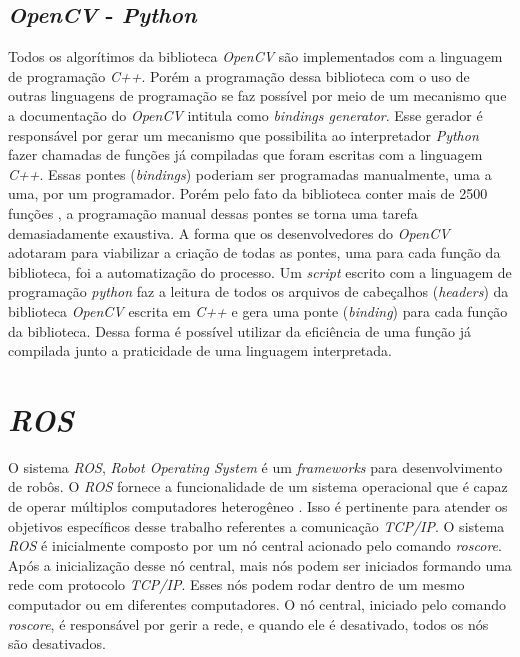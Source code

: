 \pagebreak

\subsection{\textit{OpenCV} - \textit{Python}}
Todos os algorítimos da biblioteca \textit{OpenCV} são implementados com a linguagem de programação \textit{C++}. 
Porém a programação dessa biblioteca com o uso de outras linguagens de programação se faz possível por meio de um mecanismo que a documentação do \textit{OpenCV} intitula como \textit{bindings generator}. 
Esse gerador é responsável por gerar um mecanismo que possibilita ao interpretador \textit{Python} fazer chamadas de funções já compiladas que foram escritas com a linguagem \textit{C++}.
Essas pontes (\textit{bindings}) poderiam ser programadas manualmente, uma a uma, por um programador. 
Porém pelo fato da biblioteca conter mais de 2500 funções \cite{aboutopencv2019}, a programação manual dessas pontes se torna uma tarefa demasiadamente exaustiva.
A forma que os desenvolvedores do \textit{OpenCV} adotaram para viabilizar a criação de todas as pontes, uma para cada função da biblioteca, foi a automatização do processo. 
Um \textit{script} escrito com a linguagem de programação \textit{python} faz a leitura de todos os arquivos de cabeçalhos (\textit{headers}) da biblioteca \textit{OpenCV} escrita em \textit{C++} e gera uma ponte (\textit{binding}) para cada função da biblioteca\cite{opencvpython2019}.
Dessa forma é possível utilizar da eficiência de uma função já compilada junto a praticidade de uma linguagem interpretada.
  
\pagebreak

\section{\textit{ROS}}

O sistema \textit{ROS}, \textit{Robot Operating System} é um  \textit{frameworks} para desenvolvimento de robôs. O \textit{ROS} fornece a funcionalidade de um sistema operacional que é capaz de operar múltiplos computadores heterogêneo \cite{aboutros2019}. Isso é pertinente para atender os objetivos específicos desse trabalho referentes a comunicação \textit{TCP/IP}.
O sistema \textit{ROS} é inicialmente composto por um nó central acionado pelo comando \textit{roscore}.
Após a inicialização desse nó central, mais nós podem ser iniciados formando uma rede com protocolo \textit{TCP/IP}.
Esses nós podem rodar dentro de um mesmo computador ou em diferentes computadores.
O nó central, iniciado pelo comando \textit{roscore}, é responsável por gerir a rede, e quando ele é desativado, todos os nós são desativados. 

